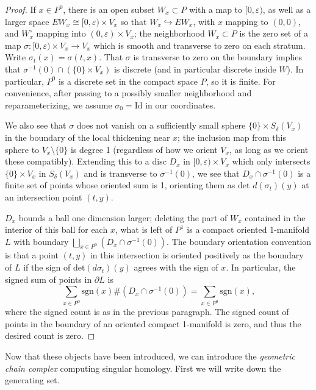 \documentclass[10pt,a4paper]{amsart}
\theoremstyle{definition}
\theoremstyle{remark}
\numberwithin{figure}{qchap}
\begin{document}
\begin{proof}If $x \in P^0$, there is an open subset $W_x \subset P$ with a map to $[0,\varepsilon)$, as well as a larger space $EW_x \cong [0,\varepsilon) \times V_x$ so that $W_x \hookrightarrow EW_x$, with $x$ mapping to $(0,0)$, and $W_x^\circ$ mapping into $(0,\varepsilon) \times V_x$; the neighborhood $W_x \subset P$ is the zero set of a map $\sigma: [0,\varepsilon) \times V_x \to V_x$ which is smooth and transverse to zero on each stratum. Write $\sigma_t(x) = \sigma(t,x)$. That $\sigma$ is transverse to zero on the boundary implies that $\sigma^{-1}(0) \cap \left(\{0\} \times V_x\right)$ is discrete (and in particular discrete inside $W$). In particular, $P^0$ is a discrete set in the compact space $P$, so it is finite. For convenience, after passing to a possibly smaller neighborhood and reparameterizing, we assume $\sigma_0 = \text{Id}$ in our coordinates.

We also see that $\sigma$ does not vanish on a sufficiently small sphere $\{0\} \times S_\delta(V_x)$ in the boundary of the local thickening near $x$; the inclusion map from this sphere to $V_x \setminus \{0\}$ is degree 1 (regardless of how we orient $V_x$, as long as we orient these compatibly). Extending this to a disc $D_x$ in $[0,\varepsilon) \times V_x$ which only intersects $\{0\} \times V_x$ in $S_\delta(V_x)$ and is transverse to $\sigma^{-1}(0)$, we see that $D_x \cap \sigma^{-1}(0)$ is a finite set of points whose oriented sum is 1, orienting them as $\text{det }d(\sigma_t)(y)$ at an intersection point $(t,y)$.

$D_x$ bounds a ball one dimension larger; deleting the part of $W_x$ contained in the interior of this ball for each $x$, what is left of $P^1$ is a compact oriented 1-manifold $L$ with boundary $\bigsqcup_{x \in P^0} \left(D_x \cap \sigma^{-1}(0)\right)$. The boundary orientation convention is that a point $(t,y)$ in this intersection is oriented positively as the boundary of $L$ if the sign of $\text{det}(d\sigma_t)(y)$ agrees with the sign of $x$. In particular, the signed sum of points in $\partial L$ is $$\sum_{x \in P^0} \text{sgn}(x) \#\left(D_x \cap \sigma^{-1}(0)\right) = \sum_{x \in P^0} \text{sgn}(x),$$ where the signed count is as in the previous paragraph. The signed count of points in the boundary of an oriented compact 1-manifold is zero, and thus the desired count is zero.
\end{proof}

Now that these objects have been introduced, we can introduce the \emph{geometric chain complex} computing singular homology. First we will write down the generating set.
\end{document}
